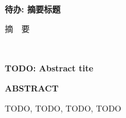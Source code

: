 \begin{center}\bf\heiti\xiaoer
	\ \\
	待办: 摘要标题
\end{center}
\vspace{1pt}
\begin{center}\heiti{}
	摘~~要
\end{center}
\hspace{2mm}
{\heiti}
\par
\vskip 5mm
~\\



\newpage
\begin{center}\heiti\xiaoer
	{\bf {TODO: Abstract tite} }
\end{center}
\vspace{1pt}
\begin{center}\heiti{}
	\bf{	ABSTRACT}
\end{center}
\vspace{-4mm}
{\heiti}\par


\vskip 4mm 
\quad
{\songti
TODO, \quad 
TODO, \quad 
TODO, \quad 
TODO}
\par
